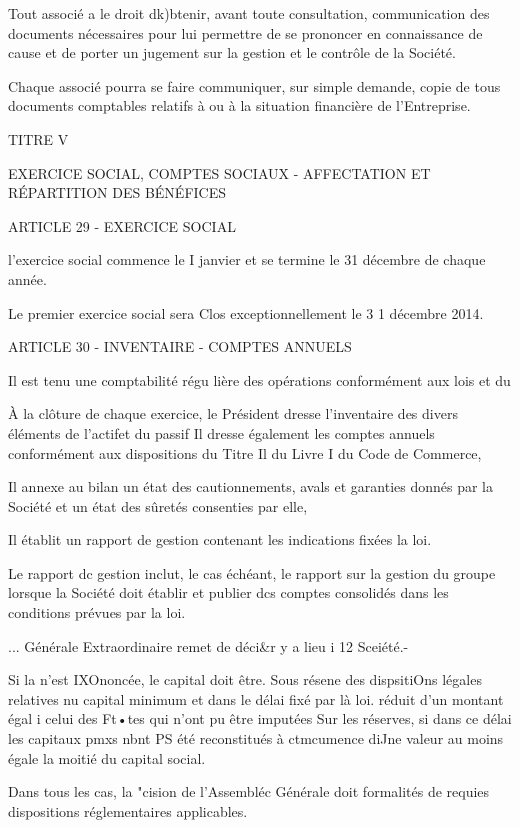 \documentclass{article}
\begin{document}
Tout associé a le droit dk)btenir, avant toute consultation, communication des documents nécessaires pour lui permettre de se prononcer en connaissance de cause et de porter un jugement sur la gestion et le contrôle de la Société.

Chaque associé pourra se faire communiquer, sur simple demande, copie de tous documents comptables relatifs à ou à la situation financière de l'Entreprise.

TITRE V

EXERCICE SOCIAL, COMPTES SOCIAUX - AFFECTATION ET RÉPARTITION DES BÉNÉFICES

ARTICLE 29 - EXERCICE SOCIAL

l'exercice social commence le I janvier et se termine le 31 décembre de chaque année.

Le premier exercice social sera Clos exceptionnellement le 3 1 décembre 2014.

ARTICLE 30 - INVENTAIRE - COMPTES ANNUELS

Il est tenu une comptabilité régu lière des opérations conformément aux lois et du

 À la clôture de chaque exercice, le Président dresse l'inventaire des divers éléments de l'actifet du passif Il dresse également les comptes annuels conformément aux dispositions du Titre Il du Livre I du Code de Commerce,

Il annexe au bilan un état des cautionnements, avals et garanties donnés par la Société et un état des sûretés consenties par elle,

Il établit un rapport de gestion contenant les indications fixées la loi.

Le rapport dc gestion inclut, le cas échéant, le rapport sur la gestion du groupe lorsque la Société doit établir et publier dcs comptes consolidés dans les conditions prévues par la loi.

... Générale Extraordinaire remet de déci&r y a lieu i 12 Sceiété.-

Si la n'est IXOnoncée, le capital doit être. Sous résene des dispsitiOns légales relatives nu capital minimum et dans le délai fixé par là loi. réduit d'un montant égal i celui des Ft•tes qui n'ont pu être imputées Sur les réserves, si dans ce délai les capitaux pmxs nbnt PS été reconstitués à ctmcumence diJne valeur au moins égale la moitié du capital social.

Dans tous les cas, la "cision de l'Assembléc Générale doit formalités de requies dispositions réglementaires applicables.
\end{document}
